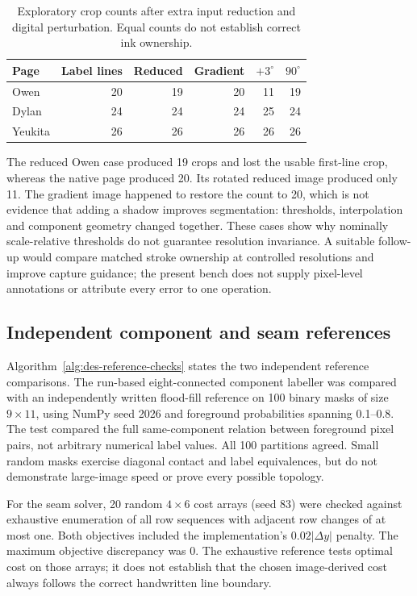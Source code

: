 \begin{table}[!htbp]\centering\small
\begin{tabular}{lrrrrr}\hline
Page & Label lines & Reduced & Gradient & $+3^\circ$ & $90^\circ$ \\\hline
Owen & 20 & 19 & 20 & 11 & 19 \\
Dylan & 24 & 24 & 24 & 25 & 24 \\
Yeukita & 26 & 26 & 26 & 26 & 26 \\
\hline\end{tabular}
\caption{Exploratory crop counts after extra input reduction and digital perturbation. Equal counts do not establish correct ink ownership.}
\label{tab:des-resample-cases}
\end{table}

The reduced Owen case produced 19 crops and lost the usable first-line crop, whereas the native page produced 20. Its rotated reduced image produced only 11. The gradient image happened to restore the count to 20, which is not evidence that adding a shadow improves segmentation: thresholds, interpolation and component geometry changed together. These cases show why nominally scale-relative thresholds do not guarantee resolution invariance. A suitable follow-up would compare matched stroke ownership at controlled resolutions and improve capture guidance; the present bench does not supply pixel-level annotations or attribute every error to one operation.

\subsection{Independent component and seam references}
Algorithm~\ref{alg:des-reference-checks} states the two independent reference comparisons.
The run-based eight-connected component labeller was compared with an independently written flood-fill reference on 100 binary masks of size $9\times11$, using NumPy seed 2026 and foreground probabilities spanning 0.1--0.8. The test compared the full same-component relation between foreground pixel pairs, not arbitrary numerical label values. All 100 partitions agreed. Small random masks exercise diagonal contact and label equivalences, but do not demonstrate large-image speed or prove every possible topology.

For the seam solver, 20 random $4\times6$ cost arrays (seed 83) were checked against exhaustive enumeration of all row sequences with adjacent row changes of at most one. Both objectives included the implementation's $0.02|\Delta y|$ penalty. The maximum objective discrepancy was $0$. The exhaustive reference tests optimal cost on those arrays; it does not establish that the chosen image-derived cost always follows the correct handwritten line boundary.

